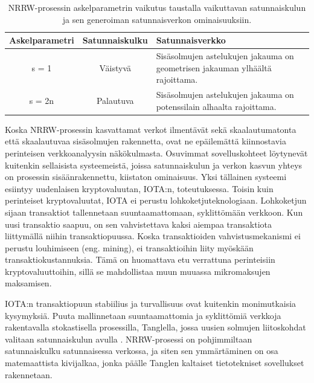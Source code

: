 \documentclass[finnish, 12pt, a4paper, sci, utf8, pdfa]{aaltothesis}
\begin{document}
\begin{table}[htb]
   \begin{center}
   \begin{tabular}{|c|c|p{7.5cm}|}
   \hline
   \textbf{Askelparametri} & \textbf{Satunnaiskulku} & \textbf{Satunnaisverkko} \\ \hline
   s = 1          & Väistyvä        & Sisäsolmujen astelukujen jakauma on geometrisen jakauman ylhäältä rajoittama. \\ \hline
   s = 2n         & Palautuva       & Sisäsolmujen astelukujen jakauma on potenssilain alhaalta rajoittama. \\ \hline
   \end{tabular}
   \end{center}
   \caption{NRRW-prosessin askelparametrin vaikutus taustalla vaikuttavan satunnaiskulun ja sen generoiman satunnaisverkon ominaisuuksiin.}
   \label{table:nrrw-character}
\end{table}

Koska NRRW-prosessin kasvattamat verkot ilmentävät sekä skaalautumatonta että skaalautuvaa sisäsolmujen rakennetta, ovat ne epäilemättä kiinnostavia perinteisen verkkoanalyysin näkökulmasta. 
Osuvimmat sovelluskohteet löytynevät kuitenkin sellaisista systeemeistä, joissa satunnaiskulun ja verkon kasvun yhteys on prosessin sisäänrakennettu, kiistaton ominaisuus. Yksi tällainen
systeemi esiintyy uudenlaisen kryptovaluutan, IOTA:n, toteutuksessa. Toisin kuin perinteiset kryptovaluutat, IOTA ei perustu lohkoketjuteknologiaan. Lohkoketjun sijaan transaktiot 
tallennetaan suuntaamattomaan, syklittömään verkkoon. Kun uusi transaktio saapuu, on sen vahvistettava kaksi aiempaa transaktiota liittymällä niihin transaktiopuussa. Koska 
transaktioiden vahvistusmekanismi ei perustu louhimiseen (eng. mining), ei transaktioihin liity myöskään transaktiokustannuksia. Tämä on huomattava etu verrattuna perinteisiin
kryptovaluuttoihin, sillä se mahdollistaa muun muuassa mikromaksujen maksamisen. \cite{Popov-WP}

IOTA:n transaktiopuun stabiilius ja turvallisuus ovat kuitenkin monimutkaisia kysymyksiä. Puuta mallinnetaan suuntaamattomia ja syklittömiä verkkoja rakentavalla stokastisella prosessilla, 
Tanglella, jossa uusien solmujen liitoskohdat valitaan satunnaiskulun avulla \cite{Popov-tangle}. NRRW-prosessi on pohjimmiltaan satunnaiskulku satunnaisessa verkossa, ja siten 
sen ymmärtäminen on osa matemaattista kivijalkaa, jonka päälle Tanglen kaltaiset tietotekniset sovellukset rakennetaan.
\end{document}

